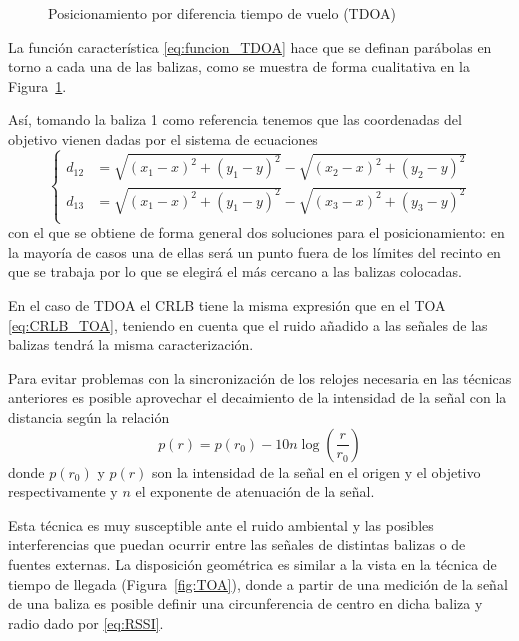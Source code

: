 \begin{figure}[H]
    \centering
    \def\svgwidth{0.55\linewidth}
	
    \caption{Posicionamiento por diferencia tiempo de vuelo (TDOA)}
    \label{fig:TDOA}
\end{figure}

La función característica \eqref{eq:funcion_TDOA} hace que se definan parábolas en torno a cada una de las balizas, como se muestra de forma cualitativa en la Figura~\ref{fig:TDOA}.

Así, tomando la baliza 1 como referencia tenemos que las coordenadas del objetivo vienen dadas por el sistema de ecuaciones
\begin{equation}
    \begin{cases}
        d_{12} &= \sqrt{(x_1 - x)^2 + (y_1 - y)^2} - \sqrt{(x_2 - x)^2 + (y_2 - y)^2} \\
        d_{13} &= \sqrt{(x_1 - x)^2 + (y_1 - y)^2} - \sqrt{(x_3 - x)^2 + (y_3 - y)^2} \\
    \end{cases}
\end{equation}
con el que se obtiene de forma general dos soluciones para el posicionamiento: en la mayoría de casos una de ellas será un punto fuera de los límites del recinto en que se trabaja por lo que se elegirá el más cercano a las balizas colocadas.

En el caso de TDOA el CRLB tiene la misma expresión que en el TOA \eqref{eq:CRLB_TOA}, teniendo en cuenta que el ruido añadido a las señales de las balizas tendrá la misma caracterización.


Para evitar problemas con la sincronización de los relojes necesaria en las técnicas anteriores es posible aprovechar el decaimiento de la intensidad de la señal con la distancia según la relación
\begin{equation}\label{eq:RSSI}
    p(r) = p(r_0) - 10n\log(\frac{r}{r_0})
\end{equation}
donde $p(r_0)$ y $p(r)$ son la intensidad de la señal en el origen y el objetivo respectivamente y $n$ el exponente de atenuación de la señal.

Esta técnica es muy susceptible ante el ruido ambiental y las posibles interferencias que puedan ocurrir entre las señales de distintas balizas o de fuentes externas.
La disposición geométrica es similar a la vista en la técnica de tiempo de llegada (Figura~\ref{fig:TOA}), donde a partir de una medición de la señal de una baliza es posible definir una circunferencia de centro en dicha baliza y radio dado por \eqref{eq:RSSI}.

